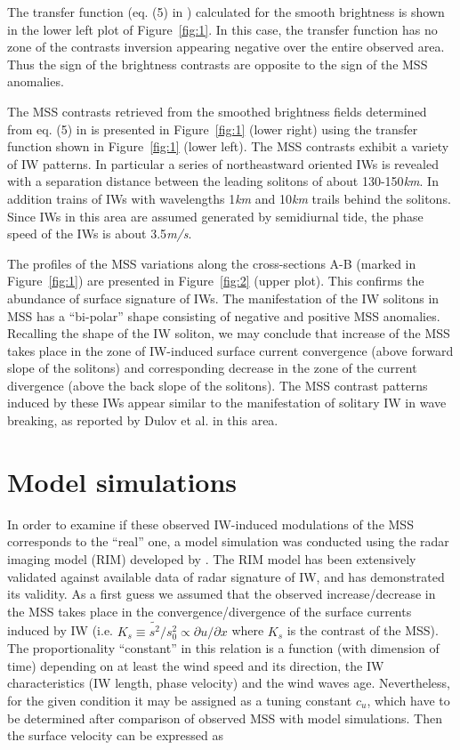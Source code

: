 \documentclass[draft,grl]{agutex}
\begin{document}
\begin{article}
The transfer function (eq. (5) in \citep{Kudryavtsev2012a}) calculated for the smooth brightness is shown in the lower left plot of Figure~\ref{fig:1}. In this case, the transfer function has no zone of the contrasts inversion appearing negative over the entire observed area. Thus the sign of the brightness contrasts are opposite to the sign of the MSS anomalies.

The MSS contrasts retrieved from the smoothed brightness fields determined from eq. (5) in \citep{Kudryavtsev2012a} is presented in Figure~\ref{fig:1} (lower right) using the transfer function shown in Figure~\ref{fig:1} (lower left). The MSS contrasts exhibit a variety of IW patterns. In particular a series of northeastward oriented IWs is revealed with a separation  distance between the leading solitons of about 130-150\textit{km}. In addition trains of IWs with wavelengths 1\textit{km} and 10\textit{km} trails behind the solitons. Since IWs in this area are assumed generated by semidiurnal tide, the phase speed of the IWs is about 3.5\textit{m/s}.   

The profiles of the MSS variations along the cross-sections A-B (marked in Figure~\ref{fig:1}) are presented in Figure~\ref{fig:2} (upper plot).  This confirms the abundance of surface signature of IWs. The manifestation of the IW solitons in MSS has a ``bi-polar'' shape consisting of negative and positive MSS anomalies. Recalling the shape of the IW soliton, we may conclude that increase of the MSS takes place in the zone of IW-induced surface current convergence (above forward slope of the solitons) and corresponding decrease in the zone of the current divergence (above the back slope of the solitons). The MSS contrast patterns induced by these IWs appear similar to the manifestation of solitary IW in wave breaking, as reported by Dulov et al. \cite{Dulov1986} in this area.


\section{Model simulations}

In order to examine if these observed IW-induced modulations of the MSS corresponds to the ``real'' one,  a model simulation was conducted using the radar imaging model (RIM) developed by \cite{Kudryavtsev2005}. The RIM model has been extensively validated against available data of radar signature of IW, and has demonstrated its validity.  As a first guess we assumed that the observed increase/decrease in the MSS takes place in the convergence/divergence of the surface currents induced by IW (i.e. $K_s \equiv \tilde{s^2} / s_0^2 \propto \partial u / \partial x$ where $K_s$ is the contrast of the MSS). The proportionality ``constant'' in this relation is a function (with dimension of time) depending on at least the wind speed and its direction, the IW characteristics (IW length, phase velocity) and the wind waves age. Nevertheless, for the given condition it may be assigned as a tuning constant $c_u$, which have to be determined after comparison of observed MSS with model simulations.  Then the surface velocity can be expressed as


\end{article}
\end{document}
